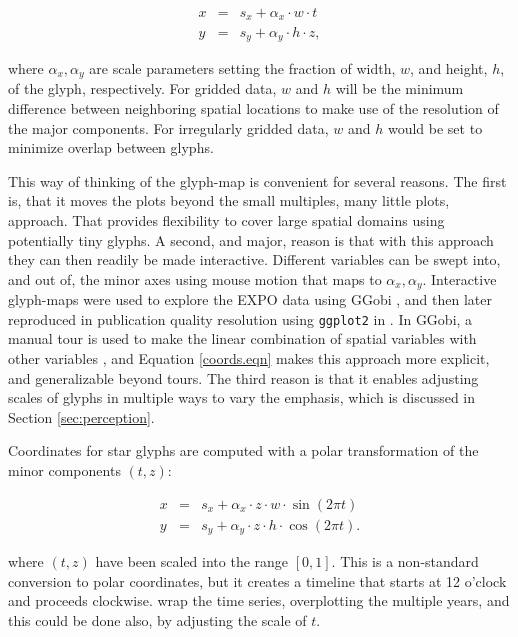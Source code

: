 \documentclass[oneside]{article}
\begin{document}
\begin{equation}
  \begin{array}{lll}
  x &=& s_x + \alpha_x \cdot w \cdot t\\
  y &=& s_y + \alpha_y \cdot h \cdot z, 
  \end{array}
  \label{coords.eqn}
\end{equation}

\noindent where $\alpha_x, \alpha_y$ are scale parameters setting the fraction of width, $w$, and height, $h$, of the glyph, respectively. For gridded data, $w$ and $h$ will be the minimum difference between neighboring spatial locations to make use of the resolution of the major components. For irregularly gridded data, $w$ and $h$ would be set to minimize overlap between glyphs.

This way of thinking of the glyph-map is convenient for several reasons. The first is, that it moves the plots beyond the small multiples, many little plots, approach. That provides flexibility to cover large spatial domains using potentially tiny glyphs. A second, and major, reason is that with this approach they can then readily be made interactive. Different variables can be swept into, and out of, the minor axes using mouse motion that maps to $\alpha_x, \alpha_y$. Interactive glyph-maps were used to explore the EXPO data using  GGobi \citep{swayne:2003}, and then later reproduced in publication quality resolution using {\tt ggplot2} \citep{me:ggplot2} in \citet{hobbs:2010}. In GGobi, a manual tour is used to make the linear combination of spatial variables with other variables \citep{CB95}, and Equation \ref{coords.eqn} makes this approach more explicit, and generalizable beyond tours. The third reason is that it enables adjusting scales of glyphs in multiple ways to vary the emphasis, which is discussed in Section \ref{sec:perception}.

Coordinates for star glyphs are computed with a polar transformation of the minor components $(t, z)$:  

\begin{equation}
  \begin{array}{lll}
  x &=& s_x + \alpha_x \cdot z \cdot w \cdot \sin(2 \pi t) \\
  y &=& s_y + \alpha_y \cdot z \cdot h \cdot \cos(2 \pi t).
  \end{array}
  \label{coords.polar.eqn}
\end{equation}

\noindent where $(t, z)$ have been scaled into the range $[0, 1]$. This is a non-standard conversion to polar coordinates, but it creates a timeline that starts at 12 o'clock and proceeds clockwise. \citet{eden:2010} wrap the time series, overplotting the multiple years, and this could be done also, by adjusting the scale of $t$. 
\end{document}
